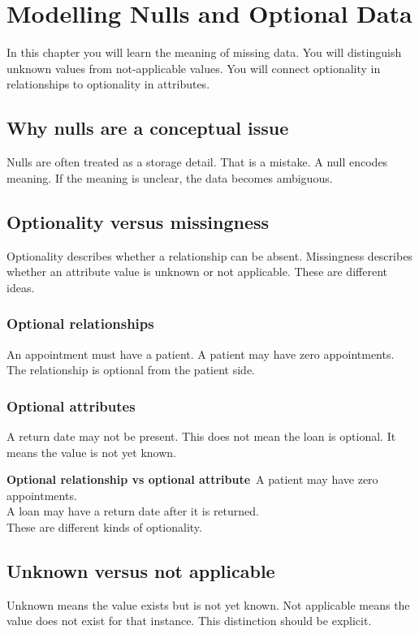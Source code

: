 \chapter{Modelling Nulls and Optional Data}

\begin{learningobjectives}
In this chapter you will learn the meaning of missing data.
You will distinguish unknown values from not-applicable values.
You will connect optionality in relationships to optionality in attributes.
\end{learningobjectives}

\section{Why nulls are a conceptual issue}
Nulls are often treated as a storage detail.
That is a mistake.
A null encodes meaning.
If the meaning is unclear, the data becomes ambiguous.

\section{Optionality versus missingness}
Optionality describes whether a relationship can be absent.
Missingness describes whether an attribute value is unknown or not applicable.
These are different ideas.

\subsection{Optional relationships}
An appointment must have a patient.
A patient may have zero appointments.
The relationship is optional from the patient side.

\subsection{Optional attributes}
A return date may not be present.
This does not mean the loan is optional.
It means the value is not yet known.

\begin{examplebox}
\textbf{Optional relationship vs optional attribute}\
A patient may have zero appointments.\\
A loan may have a return date after it is returned.\\
These are different kinds of optionality.
\end{examplebox}

\section{Unknown versus not applicable}
Unknown means the value exists but is not yet known.
Not applicable means the value does not exist for that instance.
This distinction should be explicit.

